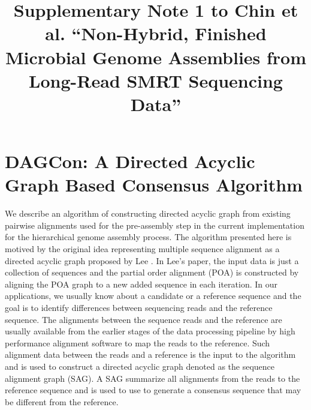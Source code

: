 \documentclass[11pt]{article}
\title{Supplementary Note 1 to Chin et al. ``Non-Hybrid, Finished Microbial Genome Assemblies from Long-Read SMRT Sequencing Data''}
\author{}
\date{}
\begin{document}
\maketitle

\tableofcontents 

\section{DAGCon: A Directed Acyclic Graph Based Consensus Algorithm}

We describe an algorithm of constructing directed acyclic graph from existing pairwise alignments used for the pre-assembly step in the current implementation for the hierarchical genome assembly process. The algorithm presented here is motived by the original idea representing multiple sequence alignment as a directed acyclic graph proposed by Lee \cite{Lee01032002}. In Lee's paper, the input data is just a collection of sequences and the partial order alignment (POA) is constructed by aligning the POA graph to a new added sequence in each iteration.  In our applications, we usually know about a candidate or a reference sequence and the goal is to identify differences between sequencing reads and the reference sequence. The alignments between the sequence reads and the reference are usually available from the earlier stages of the data processing pipeline by high performance alignment software to map the reads to the reference.  Such alignment data between the reads and a reference is the input to the algorithm and is used to construct a directed acyclic graph denoted as the sequence alignment graph (SAG). A SAG summarize all alignments from the reads to the reference sequence and is used to use to generate a consensus sequence that may be different from the reference. 
\end{document}
